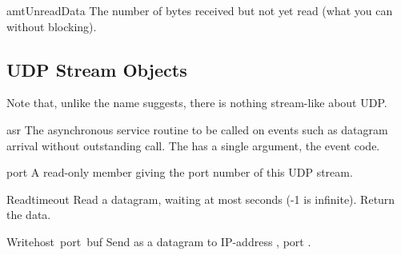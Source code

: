 \begin{datadesc}{amtUnreadData}
The number of bytes received but not yet read (what you can 
without blocking).
\end{datadesc}



\subsection{UDP Stream Objects}
Note that, unlike the name suggests, there is nothing stream-like
about UDP.


\begin{datadesc}{asr}
The asynchronous service routine to be called on events such as
datagram arrival without outstanding  call. The  has a
single argument, the event code.
\end{datadesc}

\begin{datadesc}{port}
A read-only member giving the port number of this UDP stream.
\end{datadesc}


\begin{funcdesc}{Read}{timeout}
Read a datagram, waiting at most  seconds (-1 is
infinite).  Return the data.
\end{funcdesc}

\begin{funcdesc}{Write}{host\, port\, buf}
Send  as a datagram to IP-address , port
.
\end{funcdesc}

